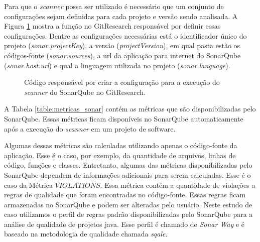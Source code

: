 Para que o \textit{scanner} possa ser utilizado é necessário que um conjunto de configurações sejam definidas para cada projeto e versão sendo analisada. A Figura \ref{fig:configuracao_sonar_scanner} mostra a função no GitResearch responsável por definir essas configurações. Dentre as configurações necessárias está o identificador único do projeto (\textit{sonar.projectKey}), a versão (\textit{projectVersion}), em qual pasta estão os códigos-fonte (\textit{sonar.sources}), a url da aplicação para internet do SonarQube (\textit{sonar.host.url}) e qual a linguagem utilizada no projeto (\textit{sonar.language}). 


 \begin{figure}[H]
  \centering
  \caption{Código responsável por criar a configuração para a execução do \textit{scanner} do SonarQube no GitResearch.}
  \label{fig:configuracao_sonar_scanner} 
\end{figure}




A Tabela \ref{table:metricas_sonar} contém as métricas que são disponibilizadas pelo SonarQube.  Essas métricas ficam disponíveis no SonarQube automaticamente após a execução do \textit{scanner} em um projeto de software. 

Algumas dessas métricas são calculadas utilizando apenas o código-fonte da aplicação. Esse é o caso, por exemplo, da quantidade de arquivos, linhas de código, funções e classes. Entretanto, algumas das métricas disponibilizadas pelo SonarQube dependem de informações adicionais para serem calculadas. Esse é o caso  da Métrica $VIOLATIONS$. Essa métrica contém a quantidade de violações a regras de qualidade que foram encontradas no código-fonte. Essas regras ficam armazenadas no SonarQube e podem ser alteradas pelo usuário. Neste estudo de caso utilizamos o perfil de regras padrão disponibilizadas pelo SonarQube para a análise de qualidade de projetos java. Esse perfil é chamado de \textit{Sonar Way}\cite{arapidis2012sonar} e é baseado na metodologia de qualidade chamada \textit{sqale}\cite{letouzey2012sqale}.


